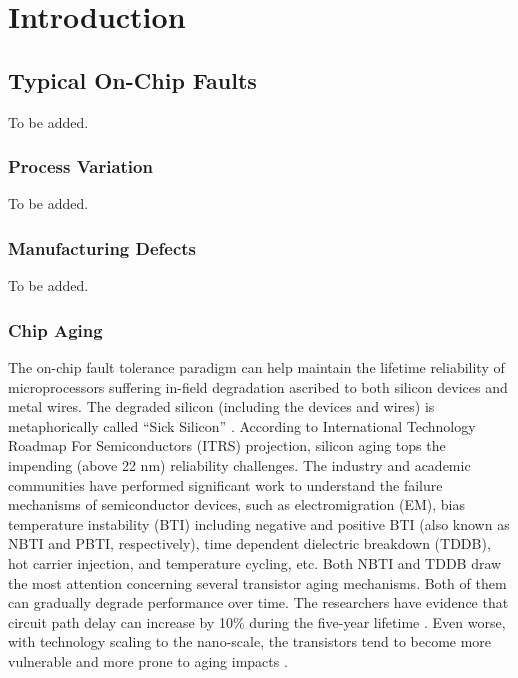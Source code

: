 %
%
%
\chapter{Introduction} \label{sec:intro}


\section{Typical On-Chip Faults} \label{sec:sec1.1}
To be added.

\subsection{Process Variation}
To be added.

\subsection{Manufacturing Defects}
To be added.

\subsection{Chip Aging}
The on-chip fault tolerance paradigm can help maintain the lifetime reliability of microprocessors suffering in-field degradation ascribed to both silicon devices and metal wires. The degraded silicon (including the devices and wires) is metaphorically called “Sick Silicon” \cite{yan2015corerank}. According to International Technology Roadmap For Semiconductors (ITRS) projection, silicon aging tops the impending (above 22 nm) reliability challenges. The industry and academic communities have performed significant work to understand the failure mechanisms of semiconductor devices, such as electromigration (EM), bias temperature instability (BTI) including negative and positive BTI (also known as NBTI and PBTI, respectively), time dependent dielectric breakdown (TDDB), hot carrier injection, and temperature cycling, etc. Both NBTI and TDDB draw the most attention concerning several transistor aging mechanisms. Both of them can gradually degrade performance over time. The researchers have evidence that circuit path delay can increase by 10\% during the five-year lifetime \cite{wang2007impact}. Even worse, with technology scaling to the nano-scale, the transistors tend to become more vulnerable and more prone to aging impacts \cite{wang2007impact}. 

